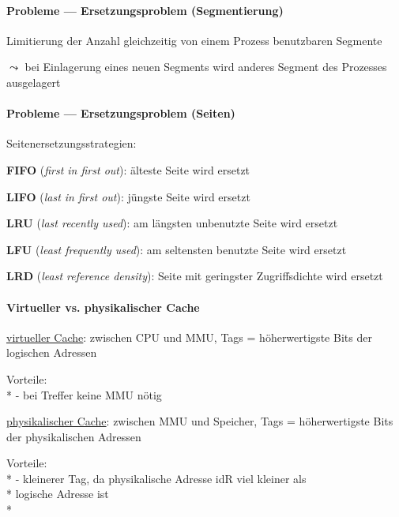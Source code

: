 \paragraph{Probleme --- Ersetzungsproblem (Segmentierung)}
\begin{items}
  \item Limitierung der Anzahl gleichzeitig von einem Prozess benutzbaren Segmente
  \item \( \leadsto \) bei Einlagerung eines neuen Segments wird anderes Segment des Prozesses ausgelagert
\end{items}

\paragraph{Probleme --- Ersetzungsproblem (Seiten)}
\begin{items}
  \item Seitenersetzungsstrategien:
  \begin{enumeration}
    \item \textbf{FIFO} (\emph{first in first out}): älteste Seite wird ersetzt
    \item \textbf{LIFO} (\emph{last in first out}): jüngste Seite wird ersetzt
    \item \textbf{LRU} (\emph{last recently used}): am längsten unbenutzte Seite wird ersetzt
    \item \textbf{LFU} (\emph{least frequently used}): am seltensten benutzte Seite wird ersetzt
    \item \textbf{LRD} (\emph{least reference density}): Seite mit geringster Zugriffsdichte wird ersetzt
  \end{enumeration}
\end{items}

\paragraph{Virtueller vs. physikalischer Cache}
\begin{items}
  \item \underline{virtueller Cache}: zwischen CPU und MMU, Tags = höherwertigste Bits der logischen Adressen
  \item Vorteile: \\*
    - bei Treffer keine MMU nötig
  \item \underline{physikalischer Cache}: zwischen MMU und Speicher, Tags = höherwertigste Bits der physikalischen Adressen
  \item Vorteile: \\*
    - kleinerer Tag, da physikalische Adresse idR viel kleiner als \\* \phantom{-} logische Adresse ist \\*
\end{items}

